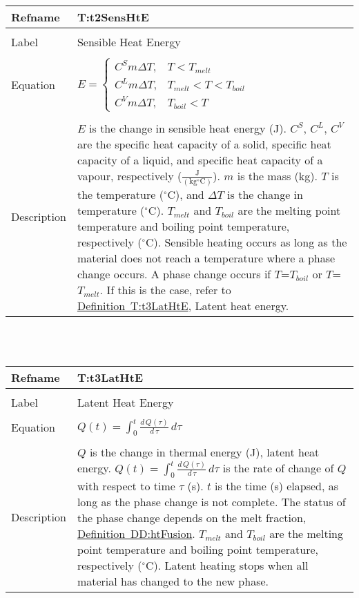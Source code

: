 \documentclass[12pt]{article}
\begin{document}
\noindent \begin{minipage}{\textwidth}
\begin{tabular}{p{} p{}}
\toprule \textbf{Refname} & \textbf{T:t2SensHtE}
\label{T:t2SensHtE}
\\ \midrule \\
Label & Sensible Heat Energy
\\ \midrule \\
Equation & $E=\begin{cases}
{C^{S}} m ΔT, & T<{T_{melt}}\\
{C^{L}} m ΔT, & {T_{melt}}<T<{T_{boil}}\\
{C^{V}} m ΔT, & {T_{boil}}<T
\end{cases}$
\\ \midrule \\
Description & $E$ is the change in sensible heat energy (J). ${C^{S}}$, ${C^{L}}$, ${C^{V}}$ are the specific heat capacity of a solid, specific heat capacity of a liquid, and specific heat capacity of a vapour, respectively ($\frac{\text{J}}{(\text{kg}{}^{\circ}\text{C})}$). $m$ is the mass (kg). $T$ is the temperature (${}^{\circ}$C), and $ΔT$ is the change in temperature (${}^{\circ}$C). ${T_{melt}}$ and ${T_{boil}}$ are the melting point temperature and boiling point temperature, respectively (${}^{\circ}$C). Sensible heating occurs as long as the material does not reach a temperature where a phase change occurs. A phase change occurs if $T$=${T_{boil}}$ or $T$=${T_{melt}}$. If this is the case, refer to \hyperref[T:t3LatHtE]{Definition~T:t3LatHtE}, Latent heat energy.
\\ \bottomrule \end{tabular}
\end{minipage}\\
~\newline
\noindent \begin{minipage}{\textwidth}
\begin{tabular}{p{} p{}}
\toprule \textbf{Refname} & \textbf{T:t3LatHtE}
\label{T:t3LatHtE}
\\ \midrule \\
Label & Latent Heat Energy
\\ \midrule \\
Equation & $Q\left(t\right)=\int_{0}^{t}{\frac{d\,Q\left(τ\right)}{d\,τ}}\,dτ$
\\ \midrule \\
Description & $Q$ is the change in thermal energy (J), latent heat energy. $Q\left(t\right)=\int_{0}^{t}{\frac{d\,Q\left(τ\right)}{d\,τ}}\,dτ$ is the rate of change of $Q$ with respect to time $τ$ (s). $t$ is the time (s) elapsed, as long as the phase change is not complete. The status of the phase change depends on the melt fraction, \hyperref[DD:htFusion]{Definition~DD:htFusion}. ${T_{melt}}$ and ${T_{boil}}$ are the melting point temperature and boiling point temperature, respectively (${}^{\circ}$C). Latent heating stops when all material has changed to the new phase.
\\ \bottomrule \end{tabular}
\end{minipage}\\
\end{document}

